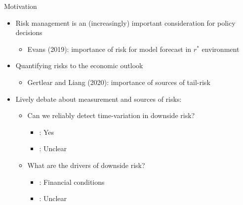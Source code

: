 \documentclass[xcolor=dvipsnames, xcolor=table, 10pt]{beamer}
\newcommand{\pb}[1]{{\color{fedblue}#1}}
\begin{document}
\begin{frame}{Motivation}
\begin{itemize}
\item Risk management is an (increasingly) important consideration for policy decisions
\begin{itemize}
\medskip
\item \pb{Evans (2019)}: importance of risk for model forecast in $r^*$ environment
\end{itemize}
\medskip
\item Quantifying risks to the economic outlook
\begin{itemize}
\medskip
\item \pb{Gertlear and Liang (2020)}: importance of sources of tail-risk
\end{itemize}
\medskip
\item Lively debate about measurement and sources of risks:
\medskip
  \begin{itemize}
  \item Can we reliably detect time-variation in downside risk?
  \medskip
    \begin{itemize}
      \item \cite{ABG19}: {Yes}
        \medskip
        \item \cite{PMRRH2020}: {Unclear}
    \end{itemize}
\medskip
  \item What are the drivers of downside risk?
\medskip
     \begin{itemize}
      \item \cite{ABG19}: Financial conditions
        \medskip
        \item \cite{PMRRH2020}: Unclear
    \end{itemize}
  \end{itemize}
\end{itemize}

\end{frame}
\end{document}
